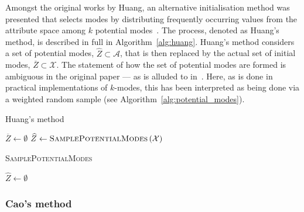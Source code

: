 \documentclass[smallextended]{svjour3}
\newcommand{\balg}{\begin{algorithm}[htbp]\DontPrintSemicolon}
\newcommand{\ealg}{\end{algorithm}}
\DeclarePairedDelimiter\abs{\lvert}{\rvert}%
\begin{document}
Amongst the original works by Huang, an alternative initialisation method was
presented that selects modes by distributing frequently occurring values from
the attribute space among \(k\) potential modes~\cite{Huang1998}. The process,
denoted as Huang's method, is described in full in Algorithm~\ref{alg:huang}.
Huang's method considers a set of potential modes, \(\widehat Z \subset \mathcal
A\), that is then replaced by the actual set of initial modes, \(\overline Z
\subset \mathcal X\). The statement of how the set of potential modes are formed
is ambiguous in the original paper --- as is alluded to in~\cite{Jiang2016}.
Here, as is done in practical implementations of \(k\)-modes, this has been
interpreted as being done via a weighted random sample (see
Algorithm~\ref{alg:potential_modes}).

\balg%
    \caption{Huang's method}\label{alg:huang}

    \(\overline Z \gets \emptyset\)\;
    \(\widehat Z \gets \textsc{SamplePotentialModes}\left(\mathcal{X}\right)\)\;

\ealg%

\balg%
    \caption{\textsc{SamplePotentialModes}}\label{alg:potential_modes}

    \(\widehat Z \gets \emptyset\)\;

\ealg%



\subsubsection{Cao's method}\label{subsec:cao}
\end{document}
